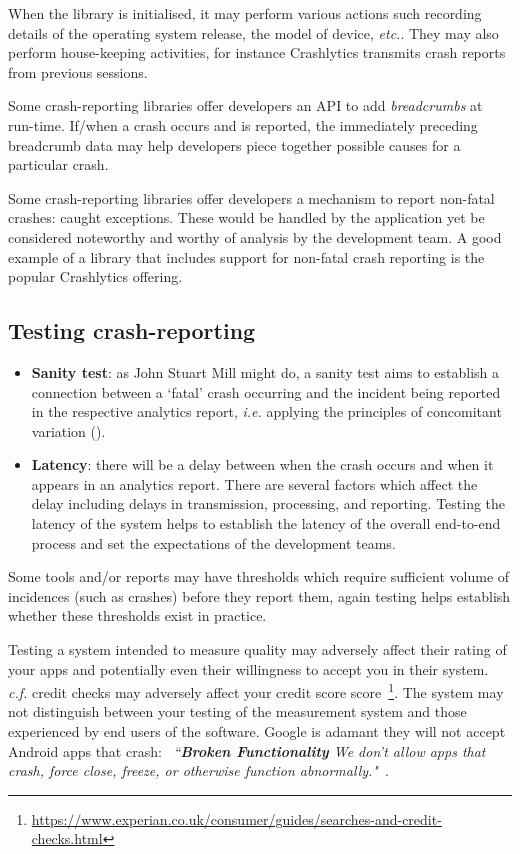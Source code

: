 When the library is initialised, it may perform various actions such recording details of the operating system release, the model of device, \emph{etc.}. They may also perform house-keeping activities, for instance Crashlytics transmits crash reports from previous sessions.

Some crash-reporting libraries offer developers an API to add \emph{breadcrumbs} at run-time. If/when a crash occurs and is reported, the immediately preceding breadcrumb data may help developers piece together possible causes for a particular crash.

Some crash-reporting libraries offer developers a mechanism to report non-fatal crashes: caught exceptions. These would be handled by the application yet be considered noteworthy and worthy of analysis by the development team. A good example of a library that includes support for non-fatal crash reporting is the popular Crashlytics offering.  

\subsection{Testing crash-reporting}
\begin{itemize}
    \item \textbf{Sanity test}: as John Stuart Mill might do, a sanity test aims to establish a connection between a `fatal' crash occurring and the incident being reported in the respective analytics report, \emph{i.e.} applying the principles of concomitant variation (\cite{mill1884system}).
    \item \textbf{Latency}: there will be a delay between when the crash occurs and when it appears in an analytics report. There are several factors which affect the delay including delays in transmission, processing, and reporting. Testing the latency of the system helps to establish the latency of the overall end-to-end process and set the expectations of the development teams.
\end{itemize}

Some tools and/or reports may have thresholds which require sufficient volume of incidences (such as crashes) before they report them, again testing helps establish whether these thresholds exist in practice.

Testing a system intended to measure quality may adversely affect their rating of your apps and potentially even their willingness to accept you in their system. \emph{c.f.} credit checks may adversely affect your credit score score~\footnote{\url{https://www.experian.co.uk/consumer/guides/searches-and-credit-checks.html}}. The system may not distinguish between your testing of the measurement system and those experienced by end users of the software. Google is adamant they will not accept Android apps that crash: ~\emph{``\textbf{Broken Functionality} We don’t allow apps that crash, force close, freeze, or otherwise function abnormally."}~\cite{google_play_developer_policy_center}.


